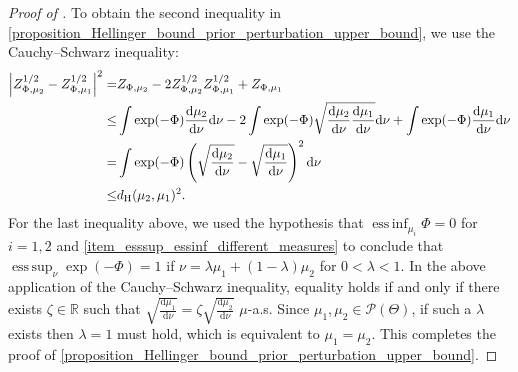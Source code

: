 \documentclass[a4paper]{scrartcl}
\theoremstyle{definition}
\numberwithin{equation}{section}
\newcommand{\R}{\mathbb{R}}
\newcommand{\rd}{\mathrm{d}}
\DeclareMathOperator*{\essinf}{ess\,inf}
\DeclareMathOperator*{\esssup}{ess\,sup}
\newcommand{\Abs}[1]{\left\vert#1\right\vert}
\newcommand{\Hel}[0]{\textup{H}}
\begin{document}
\begin{proof}[Proof of ]
To obtain the second inequality in \cref{proposition_Hellinger_bound_prior_perturbation_upper_bound}, we use the Cauchy--Schwarz inequality:
   \begin{align*}
    \Abs{Z_{\Phi,\mu_2}^{1/2}-Z_{\Phi,\mu_1}^{1/2}}^2=&Z_{\Phi,\mu_2}-2Z_{\Phi,\mu_2}^{1/2}Z_{\Phi,\mu_1}^{1/2}+Z_{\Phi,\mu_1}
    \\
    \leq & \int \exp(-\Phi) \frac{\rd \mu_2}{\rd\nu}\rd \nu-2 \int \exp(-\Phi) \sqrt{\frac{\rd \mu_2}{\rd \nu}\frac{\rd\mu_1}{\rd\nu}}\rd \nu +\int \exp(-\Phi)\frac{\rd \mu_1}{\rd\nu}\rd \nu
    \\
    =& \int \exp(-\Phi)\left(\sqrt{\frac{\rd\mu_2}{\rd\nu}}-\sqrt{\frac{\rd\mu_1}{\rd\nu}} \right)^2 \rd \nu
    \\
    \leq& d_{\Hel}(\mu_2,\mu_1)^2.
   \end{align*}
   For the last inequality above, we used the hypothesis that $\essinf_{\mu_i}\Phi=0$ for $i=1,2$ and \ref{item_esssup_essinf_different_measures} to conclude that $\esssup_\nu\exp(-\Phi)=1$ if $\nu=\lambda \mu_1+(1-\lambda)\mu_2$ for $0<\lambda<1$.
   In the above application of the Cauchy--Schwarz inequality, equality holds if and only if there exists $\zeta\in\R$ such that $\sqrt{\tfrac{\rd\mu_1}{\rd\nu}}=\zeta\sqrt{\tfrac{\rd\mu_2}{\rd\nu}}$ $\mu$-a.s. Since $\mu_1,\mu_2\in\mathcal{P}(\Theta)$, if such a $\lambda$ exists then $\lambda =1$ must hold, which is equivalent to $\mu_1=\mu_2$.
   This completes the proof of \cref{proposition_Hellinger_bound_prior_perturbation_upper_bound}.
   

\end{proof}
\end{document}
